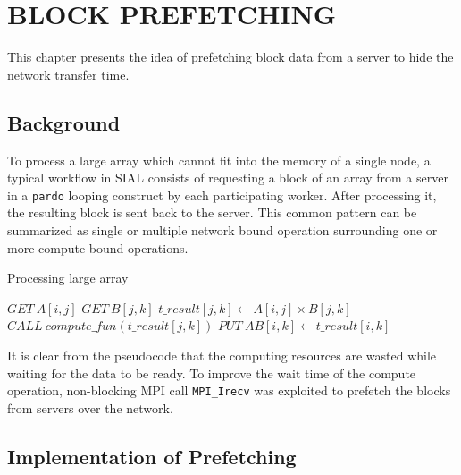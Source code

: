 \chapter{BLOCK PREFETCHING}\label{block prefetching}

This chapter presents the idea of prefetching block data from a server to hide the
network transfer time.

\section{Background}\label{prefetchingbackground}
To process a large array which cannot fit into the memory of a single node, a typical
workflow in SIAL consists of requesting a block of an array from a server in a
\texttt{pardo} looping construct by each participating worker. After processing
it, the resulting block is sent back to the server. This common pattern can be
summarized as single or multiple network bound operation surrounding one or more
compute bound operations.

\begin{algorithm}  {Processing large array}
\singlespacing

\begin{algorithmic}[1]\label{alg:SIALWorkFLow}
\Loop{}
\State $GET\ A[i, j]$
\State $GET\ B[j, k]$
\State $t\_result[j, k] \gets A[i, j] \times B[j, k]$
\State $CALL\ compute\_fun(t\_result[j, k])$
\State $PUT\ AB[i, k] \gets t\_result[i, k]$
\EndLoop
\end{algorithmic}
\end{algorithm}

It is clear from the pseudocode that the computing resources are wasted while
waiting for the data to be ready. To improve the wait time of the compute
operation, non-blocking MPI call \texttt{MPI\_Irecv} was exploited to prefetch
the blocks from servers over the network.

\section{Implementation of Prefetching}


